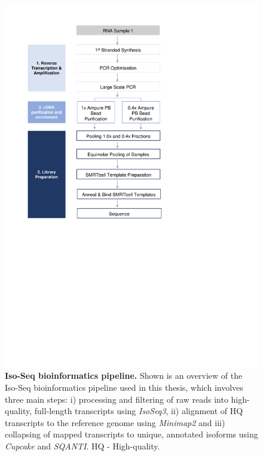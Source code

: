 \begin{figure}[]
	\centering
	\vspace{20pt}
	\includegraphics[page=17,trim={0 6cm 0 0},clip,scale = 0.8]{Figures/ProjectDevelopment_Figures.pdf}
	\captionsetup{width=0.95\textwidth}
	\caption[Iso-Seq bioinformatics pipeline]%
	{\textbf{Iso-Seq bioinformatics pipeline.} Shown is an overview of the Iso-Seq bioinformatics pipeline used in this thesis, which involves three main steps: i) processing and filtering of raw reads into high-quality, full-length transcripts using \textit{IsoSeq3}, ii) alignment of HQ transcripts to the reference genome using \textit{Minimap2} and iii) collapsing of mapped transcripts to unique, annotated isoforms using \textit{Cupcake} and \textit{SQANTI}. HQ - High-quality.}
	\label{fig:isoseq_bioinformatics_Pipeline}
\end{figure}

